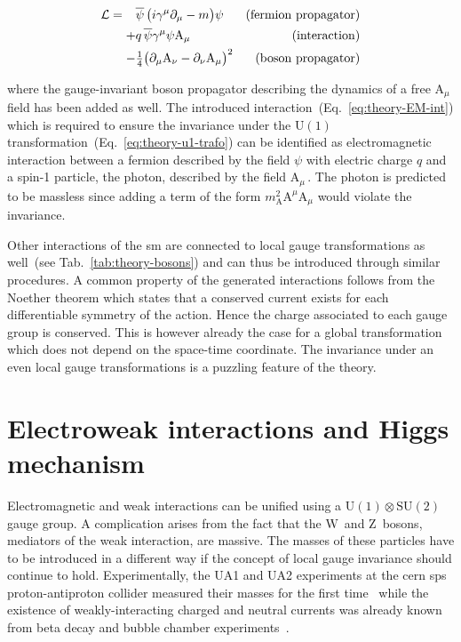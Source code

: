 
\begin{subequations}
\begin{align}
\mathcal{L}=\hphantom{+}&\bar{\psi}\,\big(i\gamma^\mu\partial_\mu-m\big)\psi &(\mathrm{fermion~propagator}) \\
            +&q\,\bar{\psi}\gamma^{\mu}\psi \mathrm{A}_{\mu} &(\mathrm{interaction}) \label{eq:theory-EM-int}\\
            -&\tfrac{1}{4}\big(\partial_\mu \mathrm{A}_\nu-\partial_\nu \mathrm{A}_\mu\big)^{2} &(\mathrm{boson~propagator})
\end{align}
\end{subequations}

where the gauge-invariant boson propagator describing the dynamics of a free $\mathrm{A}_\mu$ field has been added as well. The introduced interaction~(Eq.~\ref{eq:theory-EM-int}) which is required to ensure the invariance under the $\mathrm{U(1)}$ transformation~(Eq.~\ref{eq:theory-u1-trafo}) can be identified as electromagnetic interaction between a fermion described by the field $\psi$ with electric charge $q$ and a spin-1 particle, the photon, described by the field $\mathrm{A}_\mu$\,. The photon is predicted to be massless since adding a term of the form $m^{2}_\mathrm{A}\mathrm{A}^\mu \mathrm{A}_\mu$ would violate the invariance.

Other interactions of the \gls{sm} are connected to local gauge transformations as well~(see Tab.~\ref{tab:theory-bosons}) and can thus be introduced through similar procedures. A common property of the generated interactions follows from the Noether theorem which states that a conserved current exists for each differentiable symmetry of the action. Hence the charge associated to each gauge group is conserved. This is however already the case for a global transformation which does not depend on the space-time coordinate. The invariance under an even local gauge transformations is a puzzling feature of the theory.



\section{Electroweak interactions and Higgs mechanism}
\label{sec:theory-ewk}

Electromagnetic and weak interactions can be unified using a $\mathrm{U(1)}\otimes \mathrm{SU(2)}$ gauge group. A complication arises from the fact that the $\mathrm{W}$~and $\mathrm{Z}$~bosons, mediators of the weak interaction, are massive. The masses of these particles have to be introduced in a different way if the concept of local gauge invariance should continue to hold. Experimentally, the UA1 and UA2 experiments at the \gls{cern} \gls{sps} proton-antiproton collider measured their masses for the first time~\cite{Arnison:1983rp,Banner:1983jy,Arnison:1983mk,Bagnaia:1983zx} while the existence of weakly-interacting charged and neutral currents was already known from beta decay and bubble chamber experiments~\cite{Hasert:1973ff}.

